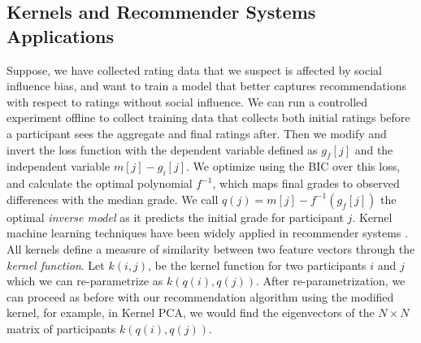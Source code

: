 \subsection{Kernels and Recommender Systems Applications}
Suppose, we have collected rating data that we suspect is affected by social influence bias, and want to train a model that better captures recommendations with respect to ratings without social influence.
We can run a controlled experiment offline to collect training data that collects both initial ratings before a participant sees the aggregate and final ratings after.
Then we modify and invert the loss function with the dependent variable defined as $g_f[j]$ and the independent variable $m[j] - g_i[j]$.
We optimize using the BIC over this loss, and calculate the optimal polynomial $f^{-1}$, which maps final grades to observed differences with the median grade.
We call $q(j) = m[j] - f^{-1}(g_f[j])$ the optimal \emph{inverse model} as it predicts the initial grade for participant $j$.
Kernel machine learning techniques have been widely applied in recommender systems \cite{abernethy2009new,basilico2004unifying,harrington2003online}.
All kernels define a measure of similarity between two feature vectors through the \emph{kernel function}.
Let $k(i,j)$, be the kernel function for two participants $i$ and $j$ which we can re-parametrize as $k(q(i),q(j))$.
After re-parametrization, we can proceed as before with our recommendation algorithm using the modified kernel, for example, in Kernel PCA, we would find the eigenvectors of the $N \times N$ matrix of participants $k(q(i),q(j))$.
